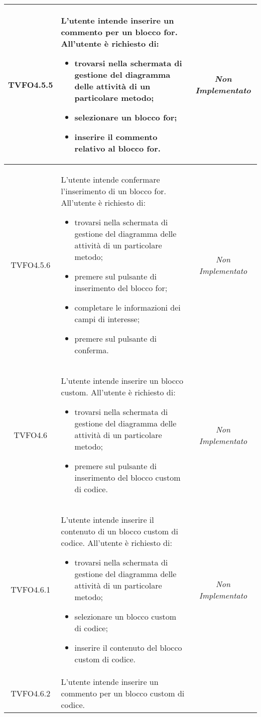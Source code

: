 \begin{longtable}{|c|>{}m{8cm}|c|}
\hypertarget{TVFO4.5.5}{TVFO4.5.5} & L'utente intende inserire un commento per un blocco for.
All'utente è richiesto di:
\begin{itemize}
	\item trovarsi nella schermata di gestione del diagramma delle attività di un particolare metodo;
	\item selezionare un blocco for;
	\item inserire il commento relativo al blocco for.
\end{itemize} & \textit{Non Implementato}\\ \hline
\hypertarget{TVFO4.5.6}{TVFO4.5.6} & L'utente intende confermare l'inserimento di un blocco for.
All'utente è richiesto di:
\begin{itemize}
	\item trovarsi nella schermata di gestione del diagramma delle attività di un particolare metodo;
	\item premere sul pulsante di inserimento del blocco for;
	\item completare le informazioni dei campi di interesse;
	\item premere sul pulsante di conferma.
\end{itemize} & \textit{Non Implementato}\\ \hline
\hypertarget{TVFO4.6}{TVFO4.6} & L'utente intende inserire un blocco custom.
All'utente è richiesto di:
\begin{itemize}
	\item trovarsi nella schermata di gestione del diagramma delle attività di un particolare metodo;
	\item premere sul pulsante di inserimento del blocco custom di codice.
\end{itemize} & \textit{Non Implementato}\\ \hline
\hypertarget{TVFO4.6.1}{TVFO4.6.1} & L'utente intende inserire il contenuto di un blocco custom di codice.
All'utente è richiesto di:
\begin{itemize}
	\item trovarsi nella schermata di gestione del diagramma delle attività di un particolare metodo;
	\item selezionare un blocco custom di codice;
	\item inserire il contenuto del blocco custom di codice.
\end{itemize} & \textit{Non Implementato}\\ \hline
\hypertarget{TVFO4.6.2}{TVFO4.6.2} & L'utente intende inserire un commento per un blocco custom di codice.

\end{longtable}
